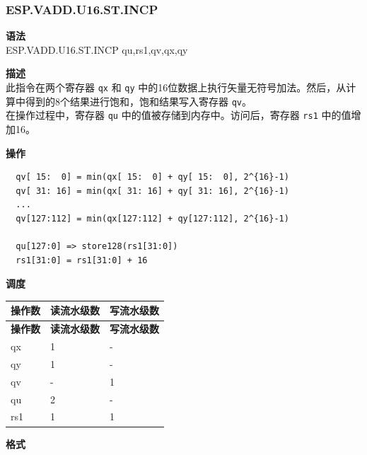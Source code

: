 \newpage
\subsubsection{ESP.VADD.U16.ST.INCP}\label{instruction:ESPVADDU16STINCP}
\textbf{语法}\\
ESP.VADD.U16.ST.INCP qu,rs1,qv,qx,qy

\textbf{描述}\\
此指令在两个寄存器 \lstinline{qx} 和 \lstinline{qy} 中的16位数据上执行矢量无符号加法。然后，从计算中得到的8个结果进行饱和，饱和结果写入寄存器 \lstinline{qv}。\\ 在操作过程中，寄存器 \lstinline{qu} 中的值被存储到内存中。访问后，寄存器 \lstinline{rs1} 中的值增加16。

\textbf{操作}\\
\begin{lstlisting}
  qv[ 15:  0] = min(qx[ 15:  0] + qy[ 15:  0], 2^{16}-1)
  qv[ 31: 16] = min(qx[ 31: 16] + qy[ 31: 16], 2^{16}-1)
  ...
  qv[127:112] = min(qx[127:112] + qy[127:112], 2^{16}-1)

  qu[127:0] => store128(rs1[31:0])
  rs1[31:0] = rs1[31:0] + 16
\end{lstlisting}


\textbf{调度}\\
\begin{longtable}[c]{|l|l|l|}
    \hline
    \rowcolor{lightgray}
    \textbf{操作数} & \textbf{读流水级数} & \textbf{写流水级数} \\\hline
    \endfirsthead
    \hline
    \rowcolor{lightgray}
     \textbf{操作数} & \textbf{读流水级数} & \textbf{写流水级数} \\\hline
    \endhead
    \hline
    \endfoot

    qx & 1 & - \\\hline
  qy & 1 & - \\\hline
     qv & - & 1 \\\hline
     qu & 2 & - \\\hline
     rs1 & 1 & 1

\end{longtable}

\textbf{格式}\\

